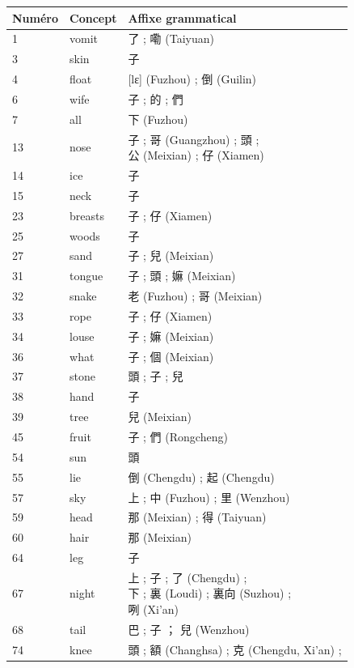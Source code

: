 \documentclass{scrbook}
\newcounter{c}[subsubsection]
\begin{document}
\begin{sloppypar}
\begin{appendices}
\begin{longtable}[htbp]{lll}
    \toprule
    Numéro & Concept & Affixe grammatical \\
    \midrule
    1     & vomit & 了 ; 嘞 (Taiyuan) \\
    3     & skin  & 子 \\
    4     & float & [lɛ] (Fuzhou) ; 倒 (Guilin) \\
    6     & wife  & 子 ; 的 ; 們 \\
    7     & all   & 下 (Fuzhou) \\
    13    & nose  & \makecell[l]{子 ; 哥 (Guangzhou) ; 頭 ; \\公 (Meixian) ; 仔 (Xiamen)} \\
    14    & ice   & 子 \\
    15    & neck  & 子 \\
    23    & breasts & 子 ; 仔 (Xiamen) \\
    25    & woods & 子 \\
    27    & sand  & 子 ; 兒 (Meixian) \\
    31    & tongue & 子 ; 頭 ; 嫲 (Meixian) \\
    32    & snake & 老 (Fuzhou) ; 哥 (Meixian) \\
    33    & rope  & 子 ; 仔 (Xiamen) \\
    34    & louse & 子 ; 嫲 (Meixian) \\
    36    & what  & 子 ; 個 (Meixian) \\
    37    & stone & 頭 ; 子 ; 兒 \\
    38    & hand  & 子 \\
    39    & tree  & 兒 (Meixian) \\
    45    & fruit & 子 ; 們 (Rongcheng) \\
    54    & sun   & 頭 \\
    55    & lie   & 倒 (Chengdu) ; 起 (Chengdu) \\
    57    & sky   & 上 ; 中 (Fuzhou) ; 里 (Wenzhou) \\
    59    & head  & 那 (Meixian) ; 得 (Taiyuan) \\
    60    & hair  & 那 (Meixian) \\
    64    & leg   & 子 \\
    67    & night & \makecell[l]{上 ; 子 ; 了 (Chengdu) ; \\下 ; 裏 (Loudi) ; 裏向 (Suzhou) ; \\咧 (Xi'an)} \\
    68    & tail  & 巴 ; 子 ； 兒 (Wenzhou) \\
    74    & knee  & 頭 ; 額 (Changhsa) ; 克 (Chengdu, Xi'an) ;  \\

\end{longtable}
\end{appendices}
\end{sloppypar}
\end{document}
